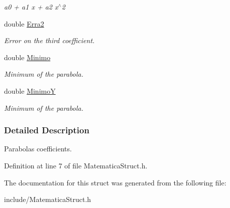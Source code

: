 \begin{DoxyCompactItemize}
\begin{DoxyCompactList}\small\item\em a0 + a1 x + a2 x$^\wedge$2 \end{DoxyCompactList}\item 
double \hyperlink{structPARABOLA_a18371909b4059cce673620670d516e01}{Erra2}\hypertarget{structPARABOLA_a18371909b4059cce673620670d516e01}{}\label{structPARABOLA_a18371909b4059cce673620670d516e01}

\begin{DoxyCompactList}\small\item\em Error on the third coefficient. \end{DoxyCompactList}\item 
double \hyperlink{structPARABOLA_a09d69325016439f54c434a28a71bf666}{Minimo}\hypertarget{structPARABOLA_a09d69325016439f54c434a28a71bf666}{}\label{structPARABOLA_a09d69325016439f54c434a28a71bf666}

\begin{DoxyCompactList}\small\item\em Minimum of the parabola. \end{DoxyCompactList}\item 
double \hyperlink{structPARABOLA_abbfab7a69ef1371aef5bf3cefa0abaa9}{MinimoY}\hypertarget{structPARABOLA_abbfab7a69ef1371aef5bf3cefa0abaa9}{}\label{structPARABOLA_abbfab7a69ef1371aef5bf3cefa0abaa9}

\begin{DoxyCompactList}\small\item\em Minimum of the parabola. \end{DoxyCompactList}\end{DoxyCompactItemize}


\subsubsection{Detailed Description}
Parabolas coefficients. 

Definition at line 7 of file Matematica\+Struct.\+h.



The documentation for this struct was generated from the following file\+:\begin{DoxyCompactItemize}
\item 
include/Matematica\+Struct.\+h\end{DoxyCompactItemize}
